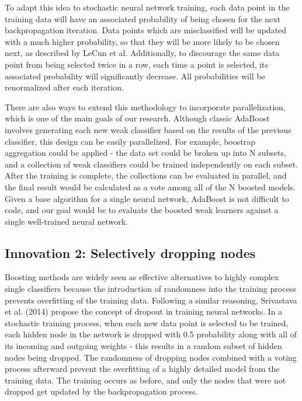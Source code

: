 \documentclass[12pt]{article}  %
\begin{document}
To adapt this idea to stochastic neural network training, each data point in the training data will have an associated probability of being chosen for the next backpropagation iteration. Data points which are misclassified will be updated with a much higher probability, so that they will be more likely to be chosen next, as described by LeCun et al. Additionally, to discourage the same data point from being selected twice in a row, each time a point is selected, its associated probability will significantly decrease. All probabilities will be renormalized after each iteration. 

There are also ways to extend this methodology to incorporate parallelization, which is one of the main goals of our research.  Although classic AdaBoost involves generating each new weak classifier based on the results of the previous classifier, this design can be easily parallelized. For example, boostrap aggregation could be applied - the data set could be broken up into N subsets, and a collection of weak classifiers could be trained independently on each subset. After the training is complete, the collections can be evaluated in parallel, and the final result would be calculated as a vote among all of the N boosted models. Given a base algorithm for a single neural network, AdaBoost is not difficult to code, and our goal would be to evaluate the boosted weak learners against a single well-trained neural network.

\subsection{Innovation 2: Selectively dropping nodes}
\label{Innovation 2: Selectively dropping nodes}
Boosting methods are widely seen as effective alternatives to highly complex single classifiers because the introduction of randomness into the training process prevents overfitting of the training data. Following a similar reasoning, Srivastava et al. (2014) propose the concept of dropout in training neural networks. In a stochastic training process, when each new data point is selected to be trained, each hidden node in the network is dropped with 0.5 probability along with all of its incoming and outgoing weights - this results in a random subset of hidden nodes being dropped. The randomness of dropping nodes combined with a voting process afterward prevent the overfitting of a highly detailed model from the training data. The training occurs as before, and only the nodes that were not dropped get updated by the backpropagation process. 
\end{document}
